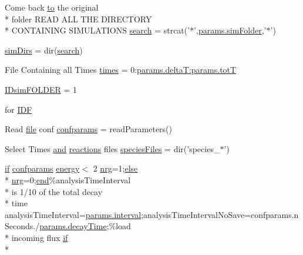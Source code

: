\begin{DoxyCompactItemize}
Come back \hyperlink{a00028_af71dbe52628a3f83a77ab494817525c6}{to} the original \\*
folder R\-E\-A\-D A\-L\-L T\-H\-E D\-I\-R\-E\-C\-T\-O\-R\-Y \\*
C\-O\-N\-T\-A\-I\-N\-I\-N\-G S\-I\-M\-U\-L\-A\-T\-I\-O\-N\-S \hyperlink{a00028_ab3186e0326a3b47b2cfcb5577ab5139f}{search} = strcat('$\ast$',\hyperlink{a00032_aa671e3345005bd599e662bcaa115b18a}{params.\-sim\-Folder},'$\ast$')
\item 
\hyperlink{a00028_aae5035eb84b89176ed5b06e136325eff}{sim\-Dirs} = dir(\hyperlink{a00028_ab3186e0326a3b47b2cfcb5577ab5139f}{search})
\item 
File Containing all Times \hyperlink{a00028_a47868b053902b822eab5c738a67a633a}{times} = 0\-:\hyperlink{a00036_aa9758857dd92f7845934f06daa7c4120}{params.\-delta\-T\-:params.\-tot\-T}
\item 
\hyperlink{a00028_aeef3e34bd64eec758eac16f004cdcef0}{I\-Dsim\-F\-O\-L\-D\-E\-R} = 1
\item 
for \hyperlink{a00028_a8acdc1bee73718b1ffcfc7eb26968f48}{I\-D\-F}
\item 
Read \hyperlink{a00068_a4e8353d6c62cf54bf4a1a8f63e56b8c3}{file} conf \hyperlink{a00028_a000cb2f4b2f69aebbfb0e8e0809567f6}{confparams} = read\-Parameters()
\item 
Select Times \hyperlink{a00028_a170f8acb213f91bf71c77b1d20bceb33}{and} \hyperlink{a00021}{reactions} files \hyperlink{a00028_af5703745c2c2a6af7f62da460994d9c2}{species\-Files} = dir('species\-\_$\ast$')
\item 
\hyperlink{a00030_a01d55766b8058903dd360b4bda71f9f5}{if} \hyperlink{a00033_a53a794fb4119b36e89d14a405e075596}{confparams} \hyperlink{a00071_ac002779c383d2cc783e881f94449de66}{energy}$<$ 2 \hyperlink{a00028_af837f695e5b67c86016c1a82608c38b4}{nrg}=1;\hyperlink{a00031_af5946383720aa572eb93e1e63afc23c2}{else} \\*
\hyperlink{a00028_af837f695e5b67c86016c1a82608c38b4}{nrg}=0;\hyperlink{a00025_afb358f48b1646c750fb9da6c6585be2b}{end}\%analysis\-Time\-Interval \\*
is 1/10 of the total decay \\*
time analysis\-Time\-Interval=\hyperlink{a00028_a4d8f56ee83b9b4dbe17b218746a1768c}{params.\-interval};analysis\-Time\-Interval\-No\-Save=confparams.\-n\-Seconds./\hyperlink{a00036_afb6aa83fb78c663f3b39be2380842a8b}{params.\-decay\-Time};\%load \\*
incoming flux \hyperlink{a00030_a01d55766b8058903dd360b4bda71f9f5}{if} \\*

\end{DoxyCompactItemize}
